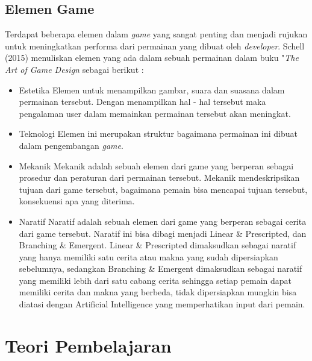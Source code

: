 	\subsection{Elemen Game}
	Terdapat beberapa elemen dalam \textit{game} yang sangat penting dan menjadi rujukan untuk meningkatkan performa dari permainan yang dibuat oleh \textit{developer}. Schell (2015) menuliskan elemen yang ada dalam sebuah permainan dalam buku "\textit{The Art of Game Design} sebagai berikut :
	\begin{itemize}
		\item Estetika
			\subitem Elemen untuk menampilkan gambar, suara dan suasana dalam permainan tersebut. Dengan menampilkan hal - hal tersebut maka pengalaman user dalam memainkan permainan tersebut akan meningkat.
		\item Teknologi
			\subitem Elemen ini merupakan struktur bagaimana permainan ini dibuat dalam pengembangan \textit{game}.
		\item Mekanik
			\subitem Mekanik adalah sebuah elemen dari game yang berperan sebagai prosedur dan peraturan dari permainan tersebut. Mekanik mendeskripsikan tujuan dari game tersebut, bagaimana pemain bisa mencapai tujuan tersebut, konsekuensi apa yang diterima.
		\item Naratif
			\subitem Naratif adalah sebuah elemen dari game yang berperan sebagai cerita dari game tersebut. Naratif ini bisa dibagi menjadi Linear \& Prescripted, dan Branching \& Emergent. Linear \& Prescripted dimaksudkan sebagai naratif yang hanya memiliki satu cerita atau makna yang sudah dipersiapkan sebelumnya, sedangkan Branching \& Emergent dimaksudkan sebagai naratif yang memiliki lebih dari satu cabang cerita sehingga setiap pemain dapat memiliki cerita dan makna yang berbeda, tidak dipersiapkan mungkin bisa diatasi dengan Artificial Intelligence yang memperhatikan input dari pemain.
	\end{itemize}
	
\section{Teori Pembelajaran}
